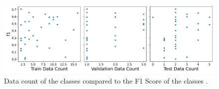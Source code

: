 \begin{figure}[h]
\centering
\captionsetup{width=0.9\linewidth}
\includegraphics[width=1.0\textwidth]{figures/f1_per_class_to_data_distribution.pdf}
\caption{Data count of the classes compared to the F1 Score of the classes .}
\label{fig:f1_per_class_to_data_distribution}
\end{figure}
